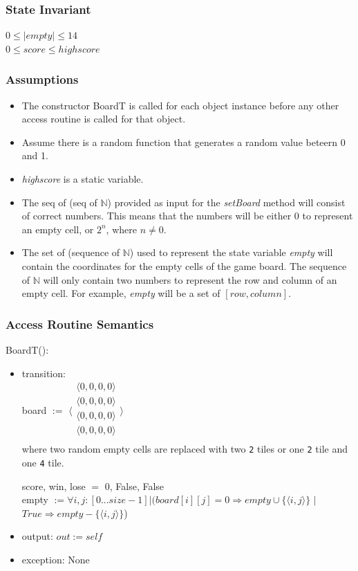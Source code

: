 \documentclass[12pt]{article}
\begin{document}
\subsubsection* {State Invariant}

$0 \le |empty| \le 14$\\
$0 \le score \le highscore$

\subsubsection* {Assumptions}

\begin{itemize}
  \item The constructor BoardT is called for each object instance before any other access routine 
  is called for that object. 
  \item Assume there is a random function that generates a random value beteern 0 and 1.
  \item \textit{highscore} is a static variable.
  \item The seq of (seq of $\mathbb{N}$) provided as input for the \textit{setBoard} method will consist of correct numbers. This means that the numbers will be either $0$ to represent an empty cell, or $2^n$, where $n \ne 0$.
  \item The set of (sequence of $\mathbb{N}$) used to represent the state variable \textit{empty} will contain the coordinates for the empty cells of the game board. The sequence of $\mathbb{N}$ will only contain two numbers to represent the row and column of an empty cell. For example, \textit{empty} will be a set of $[row, column]$.
\end{itemize}

\subsubsection* {Access Routine Semantics}

BoardT():
\begin{itemize}
\item transition: \\
      board $:=$ 
      $\langle \begin{array}{c}
      \langle 0, 0, 0, 0 \rangle\\
      \langle 0, 0, 0, 0 \rangle\\
      \langle 0, 0, 0, 0 \rangle\\
      \langle 0, 0, 0, 0 \rangle\\
      \end{array} \rangle$ \\ 
      where two random empty cells are replaced with two \texttt{2} tiles or one \texttt{2} tile and one \texttt{4} tile.

      score, win, lose $=$ 0, False, False\\
      empty $:= \forall i, j : [0...size-1] | (board[i][j] = 0 \Rightarrow empty \cup \{\langle i, j \rangle\}$ $|$ $True \Rightarrow empty - \{\langle i, j \rangle\}$)
\item output: $out := \mathit{self}$
\item exception: None
\end{itemize}
\end{document}
